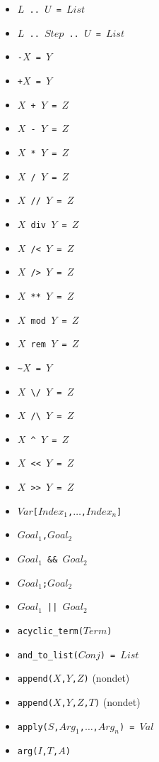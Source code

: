 \documentclass[10pt]{article}
\begin{document}
\begin{multicols}{2}
\begin{scriptsize}
\begin{itemize}
    \item {\tt $L$ \verb+..+ $U$ = $List$}
    \item {\tt $L$ \verb+..+ $Step$ \verb+..+ $U$ = $List$}
    \item {\tt \verb+-+$X$ = $Y$}
    \item {\tt \verb-+-$X$ = $Y$}
    \item {\tt $X$ \verb-+- $Y$ = $Z$}
    \item {\tt $X$ \verb+-+ $Y$ = $Z$}
    \item {\tt $X$ \verb+*+ $Y$ = $Z$}
    \item {\tt $X$ \verb+/+ $Y$ = $Z$}
    \item {\tt $X$ \verb+//+ $Y$ = $Z$}
    \item \texttt{$X$ div $Y$ = $Z$}
    \item {\tt $X$ \verb+/<+ $Y$ = $Z$}
    \item {\tt $X$ \verb+/>+ $Y$ = $Z$}
    \item {\tt $X$ \verb+**+ $Y$ = $Z$}
    \item \texttt{$X$ mod $Y$ = $Z$}
    \item \texttt{$X$ rem $Y$ = $Z$}
    \item {\tt \verb+~+$X$ = $Y$}
    \item {\tt $X$ \verb+\/+ $Y$ = $Z$}
    \item {\tt $X$ \verb+/\+ $Y$ = $Z$}
    \item {\tt $X$ \verb+^+ $Y$ = $Z$}
    \item {\tt $X$ \verb+<<+ $Y$ = $Z$}
    \item {\tt $X$ \verb+>>+ $Y$ = $Z$}
    \item {\tt $Var$\verb+[+$Index_1$,$\ldots$,$Index_n$\verb+]+}
    \item \texttt{$Goal_1$,$Goal_2$}
    \item \texttt{$Goal_1$ \&\& $Goal_2$}
    \item \texttt{$Goal_1$;$Goal_2$}
    \item \texttt{$Goal_1$ || $Goal_2$}
    \item \texttt{acyclic\_term($Term$)}
    \item \texttt{and\_to\_list($Conj$) = $List$}
    \item \texttt{append($X$,$Y$,$Z$)}  (nondet)
    \item \texttt{append($X$,$Y$,$Z$,$T$)}  (nondet)
    \item \texttt{apply($S$,$Arg_1$,$\ldots$,$Arg_n$) = $Val$}
    \item \texttt{arg($I$,$T$,$A$)}

\end{itemize}
\end{scriptsize}
\end{multicols}
\end{document}
